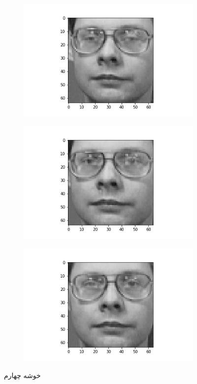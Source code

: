 \documentclass[12pt, a4paper]{article}
\begin{document}
\begin{figure}[h]
    \begin{subfigure}{0.3\linewidth}
        \centering
        \includegraphics[width=\linewidth]{images/q3/c/3/0.png}
    \end{subfigure}
    \hfill
    \begin{subfigure}{0.3\linewidth}
        \centering
        \includegraphics[width=\linewidth]{images/q3/c/3/1.png}
    \end{subfigure}
    \hfill
    \begin{subfigure}{0.3\linewidth}
        \centering
        \includegraphics[width=\linewidth]{images/q3/c/3/2.png}
    \end{subfigure}
    \caption{خوشه چهارم}
\end{figure}
\end{document}
